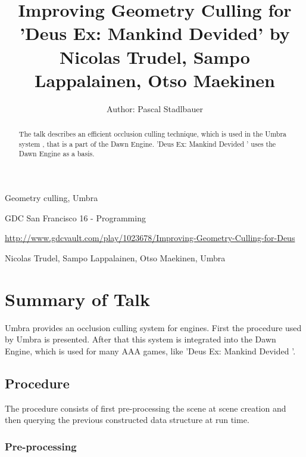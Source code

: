 \documentclass[a4paper]{article}
\title{Improving Geometry Culling for 'Deus Ex: Mankind Devided' by Nicolas Trudel, Sampo Lappalainen, Otso Maekinen}
\author{Author: Pascal Stadlbauer}
\begin{document}
\maketitle

\begin{keywords} Geometry culling, Umbra \end{keywords}

\begin{track} GDC San Francisco 16 - Programming \end{track}

\begin{talkurl}  \url{http://www.gdcvault.com/play/1023678/Improving-Geometry-Culling-for-Deus} \end{talkurl}

\begin{speaker} Nicolas Trudel, Sampo Lappalainen, Otso Maekinen, Umbra \end{speaker}


\begin{abstract}

The talk describes an efficient occlusion culling technique, which is used in the Umbra system \cite{umbra},
that is a part of the Dawn Engine. 'Deus Ex: Mankind Devided ' uses the Dawn Engine \cite{dawn} as a basis.

\end{abstract}

\section{Summary of Talk}


Umbra provides an occlusion culling system for engines. First the procedure used by Umbra is presented. After that this system is integrated into the Dawn Engine, which is used for many AAA games, like 'Deus Ex: Mankind Devided '.

\subsection{Procedure}

The procedure consists of first pre-processing the scene at scene creation and then querying the previous constructed data structure at run time.

\subsubsection{Pre-processing}
\end{document}
